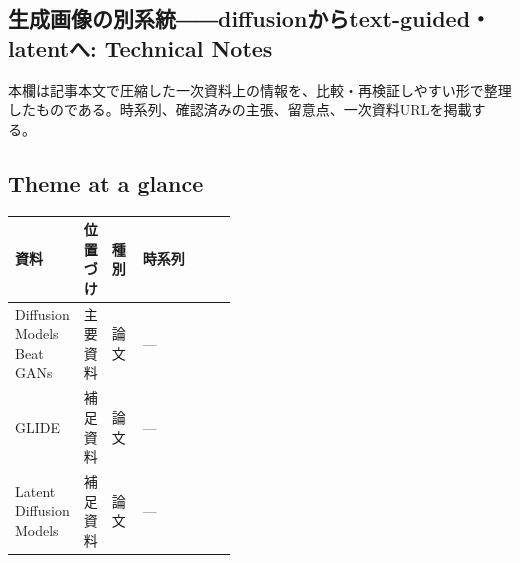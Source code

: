 \subsection*{生成画像の別系統――diffusionからtext-guided・latentへ: Technical Notes}
本欄は記事本文で圧縮した一次資料上の情報を、比較・再検証しやすい形で整理したものである。時系列、確認済みの主張、留意点、一次資料URLを掲載する。
\medskip
\subsection*{Theme at a glance}
\begin{center}
\footnotesize
\begin{tabularx}{\linewidth}{@{}p{0.20\linewidth}p{0.10\linewidth}p{0.14\linewidth}X@{}}
\toprule
資料 & 位置づけ & 種別 & 時系列 \\
\midrule
Diffusion Models Beat GANs & 主要資料 & 論文 & — \\
GLIDE & 補足資料 & 論文 & — \\
Latent Diffusion Models & 補足資料 & 論文 & — \\
\bottomrule
\end{tabularx}
\end{center}
\normalsize


